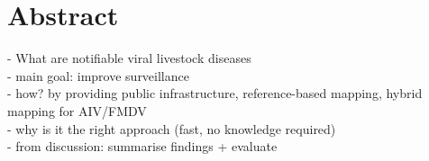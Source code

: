 \chapter*{Abstract}
\todoit

- What are notifiable viral livestock diseases \\
- main goal: improve surveillance \\
- how? by providing public infrastructure, reference-based mapping, hybrid mapping for AIV/FMDV \\
- why is it the right approach (fast, no knowledge required) \\
- from discussion: summarise findings + evaluate 
